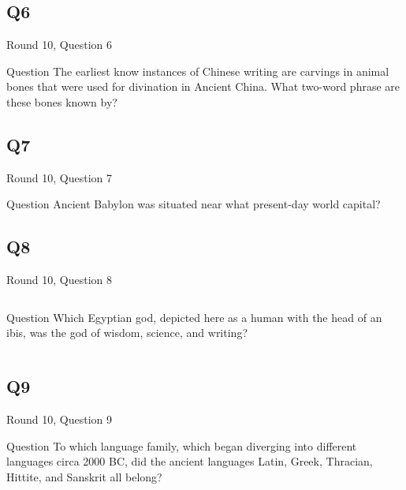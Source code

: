 \documentclass[11pt]{beamer}
\begin{document}
\subsection*{Q6}
\begin{frame}[t]{Round 10, Question 6}
\begin{block}{Question}
The earliest know instances of Chinese writing are carvings in animal bones that were used for divination in Ancient China. What two-word phrase are these bones known by?
\end{block}
\end{frame}
\subsection*{Q7}
\begin{frame}[t]{Round 10, Question 7}
\begin{block}{Question}
Ancient Babylon was situated near what present-day world capital?
\end{block}
\end{frame}
\subsection*{Q8}
\begin{frame}[t]{Round 10, Question 8}
\begin{columns}[T,totalwidth=\linewidth]
\begin{column}{0.32\linewidth}
\begin{block}{Question}
Which Egyptian god, depicted here as a human with the head of an ibis, was the god of wisdom, science, and writing?
\end{block}
\end{column}
\begin{column}{0.65\linewidth}
\begin{center}
\texttt{[image: \{Images/thoth]}.png}
\end{center}
\end{column}
\end{columns}
\end{frame}
\subsection*{Q9}
\begin{frame}[t]{Round 10, Question 9}
\begin{block}{Question}
To which language family, which began diverging into different languages circa  2000 BC, did the ancient languages Latin, Greek, Thracian, Hittite, and Sanskrit all belong?
\end{block}
\end{frame}
\end{document}
